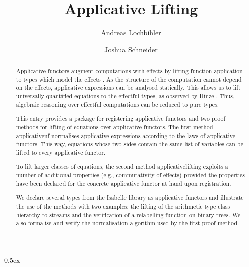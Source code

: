 \documentclass[11pt,a4paper]{article}
\begin{document}
\title{Applicative Lifting}
\author{Andreas Lochbihler \and Joshua Schneider}
\maketitle

\begin{abstract}
  Applicative functors augment computations with effects by lifting function application to types
  which model the effects \cite{mcbride08}.
  As the structure of the computation cannot depend on the effects, applicative expressions can be
  analysed statically.
  This allows us to lift universally quantified equations to the effectful types, as observed by 
  Hinze \cite{hinze10}.
  Thus, algebraic reasoning over effectful computations can be reduced to pure types.

  This entry provides a package for registering applicative functors and two proof methods for
  lifting of equations over applicative functors.
  The first method applicative{\isacharunderscore}nf normalises applicative expressions according to
  the laws of applicative functors.
  This way, equations whose two sides contain the same list of variables can be lifted to every
  applicative functor.

  To lift larger classes of equations, the second method applicative{\isacharunderscore}\linebreak lifting
  exploits a number of additional properties (e.g., commutativity of effects) provided the
  properties have been declared for the concrete applicative functor at hand upon registration.

  We declare several types from the Isabelle library as applicative functors and illustrate the use of
  the methods with two examples: the lifting of the arithmetic type class hierarchy to streams and
  the verification of a relabelling function on binary trees.
  We also formalise and verify the normalisation algorithm used by the first proof method.
\end{abstract}

\tableofcontents

\parindent 0pt\parskip 0.5ex





\end{document}
